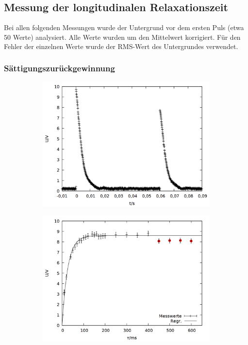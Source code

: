 \subsection{Messung der longitudinalen Relaxationszeit}
Bei allen folgenden Messungen wurde der Untergrund vor dem ersten Puls (etwa 50 Werte) analysiert. Alle Werte wurden um den Mittelwert korrigiert. Für den Fehler der einzelnen Werte wurde der RMS-Wert des Untergrundes verwendet.
\subsubsection{Sättigungszurückgewinnung}
\begin{figure}[h]
  \begin{subfigure}[h]{0.5\textwidth}
    \centering
    \includegraphics[width=\linewidth]{data/p402_443_data/saettigungszurueckgewinnung/plot_81.png}
    \label{fig:sat_bsp}
  \end{subfigure}%
  \begin{subfigure}[h]{0.5\textwidth}
    \centering
    \includegraphics[width=\linewidth]{data/p402_443_data/saettigungszurueckgewinnung/out_sat.png}

\end{subfigure}
\end{figure}
